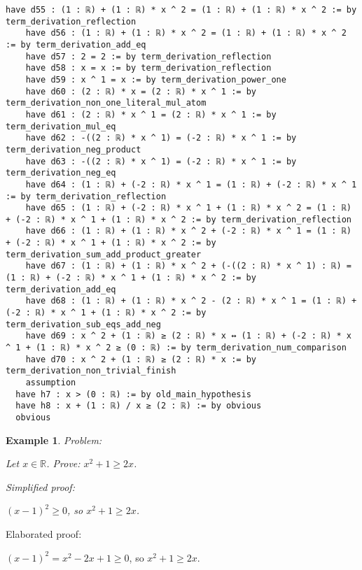 \documentclass{article}
\newtheorem{example}{Example}
\begin{document}
\begin{tcolorbox}[colback=white!10, width=\linewidth]
\begin{lstlisting}[language=Lean4]
    have d55 : (1 : ℝ) + (1 : ℝ) * x ^ 2 = (1 : ℝ) + (1 : ℝ) * x ^ 2 := by term_derivation_reflection
    have d56 : (1 : ℝ) + (1 : ℝ) * x ^ 2 = (1 : ℝ) + (1 : ℝ) * x ^ 2 := by term_derivation_add_eq
    have d57 : 2 = 2 := by term_derivation_reflection
    have d58 : x = x := by term_derivation_reflection
    have d59 : x ^ 1 = x := by term_derivation_power_one
    have d60 : (2 : ℝ) * x = (2 : ℝ) * x ^ 1 := by term_derivation_non_one_literal_mul_atom
    have d61 : (2 : ℝ) * x ^ 1 = (2 : ℝ) * x ^ 1 := by term_derivation_mul_eq
    have d62 : -((2 : ℝ) * x ^ 1) = (-2 : ℝ) * x ^ 1 := by term_derivation_neg_product
    have d63 : -((2 : ℝ) * x ^ 1) = (-2 : ℝ) * x ^ 1 := by term_derivation_neg_eq
    have d64 : (1 : ℝ) + (-2 : ℝ) * x ^ 1 = (1 : ℝ) + (-2 : ℝ) * x ^ 1 := by term_derivation_reflection
    have d65 : (1 : ℝ) + (-2 : ℝ) * x ^ 1 + (1 : ℝ) * x ^ 2 = (1 : ℝ) + (-2 : ℝ) * x ^ 1 + (1 : ℝ) * x ^ 2 := by term_derivation_reflection
    have d66 : (1 : ℝ) + (1 : ℝ) * x ^ 2 + (-2 : ℝ) * x ^ 1 = (1 : ℝ) + (-2 : ℝ) * x ^ 1 + (1 : ℝ) * x ^ 2 := by term_derivation_sum_add_product_greater
    have d67 : (1 : ℝ) + (1 : ℝ) * x ^ 2 + (-((2 : ℝ) * x ^ 1) : ℝ) = (1 : ℝ) + (-2 : ℝ) * x ^ 1 + (1 : ℝ) * x ^ 2 := by term_derivation_add_eq
    have d68 : (1 : ℝ) + (1 : ℝ) * x ^ 2 - (2 : ℝ) * x ^ 1 = (1 : ℝ) + (-2 : ℝ) * x ^ 1 + (1 : ℝ) * x ^ 2 := by term_derivation_sub_eqs_add_neg
    have d69 : x ^ 2 + (1 : ℝ) ≥ (2 : ℝ) * x ↔ (1 : ℝ) + (-2 : ℝ) * x ^ 1 + (1 : ℝ) * x ^ 2 ≥ (0 : ℝ) := by term_derivation_num_comparison
    have d70 : x ^ 2 + (1 : ℝ) ≥ (2 : ℝ) * x := by term_derivation_non_trivial_finish
    assumption
  have h7 : x > (0 : ℝ) := by old_main_hypothesis
  have h8 : x + (1 : ℝ) / x ≥ (2 : ℝ) := by obvious
  obvious

\end{lstlisting}
\end{tcolorbox}


\begin{example}
Problem:
\begin{tcolorbox}[colback=yellow!10, width=\linewidth]
Let $x\in\mathbb{R}$. Prove: $x^2 + 1\ge 2x$.
\end{tcolorbox}

Simplified proof:
\begin{tcolorbox}[colback=blue!10, width=\linewidth]
$(x-1)^2 \ge 0$, so $x^2 + 1 \ge 2x$.
\end{tcolorbox}
\end{example}

Elaborated proof:
\begin{tcolorbox}[colback=green!10, width=\linewidth]
$(x-1)^2 = x^2 - 2x + 1 \ge 0$, so $x^2 + 1 \ge 2x$.
\end{tcolorbox}
\end{document}
